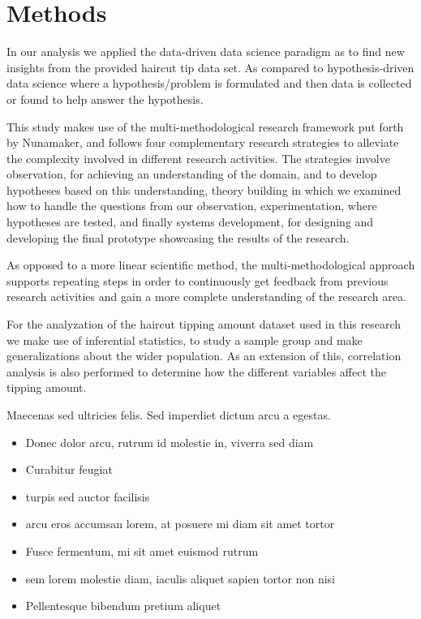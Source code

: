 \documentclass[twoside,twocolumn]{article}
\begin{document}
\section{Methods}
In our analysis we applied the data-driven data science paradigm as to find new insights from the provided haircut tip data set.
As compared to hypothesis-driven data science where a hypothesis/problem is formulated and then data is collected or found to help answer the hypothesis.

This study makes use of the multi-methodological research framework put forth by Nunamaker, and follows four complementary research strategies to alleviate the complexity involved in different research activities. The strategies involve observation, for achieving an understanding of the domain, and to develop hypotheses based on this understanding, theory building in which we examined how to handle the questions from our observation, experimentation, where hypotheses are tested, and finally systems development, for designing and developing the final prototype showcasing the results of the research.

As opposed to a more linear scientific method, the multi-methodological approach supports repeating steps in order to continuously get feedback from previous research activities and gain a more complete understanding of the research area.

For the analyzation of the haircut tipping amount dataset used in this research we make use of inferential statistics, to study a sample group and make generalizations about the wider population. As an extension of this, correlation analysis is also performed to determine how the different variables affect the tipping amount.

Maecenas sed ultricies felis. Sed imperdiet dictum arcu a egestas.
\begin{itemize}
\item Donec dolor arcu, rutrum id molestie in, viverra sed diam
\item Curabitur feugiat
\item turpis sed auctor facilisis
\item arcu eros accumsan lorem, at posuere mi diam sit amet tortor
\item Fusce fermentum, mi sit amet euismod rutrum
\item sem lorem molestie diam, iaculis aliquet sapien tortor non nisi
\item Pellentesque bibendum pretium aliquet
\end{itemize}
\blindtext %
\end{document}
